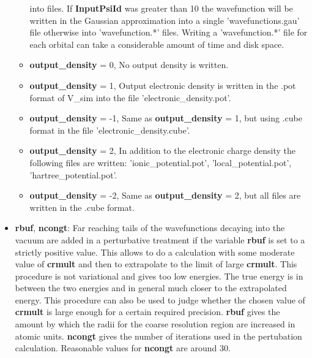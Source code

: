 \documentclass[a4paper,11pt]{report}
\begin{document}
\begin{itemize}
\begin{itemize}
                               into files. If {\bf InputPsiId } was greater than 10 the wavefunction will be written 
                               in the Gaussian approximation into  a single 'wavefunctions.gau' file otherwise into 
                               'wavefunction.*' files. Writing a  'wavefunction.*' file for each orbital can take a considerable 
                               amount of time and disk space. 
       \item {\bf output\_density} = 0, No output density is written.
       \item {\bf output\_density} = 1, Output electronic density is written in the .pot format of V\_sim into the file 'electronic\_density.pot'.
       \item {\bf output\_density} = -1, Same as  {\bf output\_density} = 1, but using .cube format in the file 'electronic\_density.cube'.
       \item {\bf output\_density} = 2, In addition to the electronic charge density the following files are written:
                                  'ionic\_potential.pot', 'local\_potential.pot', 'hartree\_potential.pot'.
       \item {\bf output\_density} = -2, Same as {\bf output\_density} = 2, but all files are written in the .cube format.
      \end{itemize}
\item {\bf rbuf}, {\bf ncongt}:  Far reaching tails of the wavefunctions decaying into the vacuum are  
                                      added in a perturbative
treatment if the variable {\bf rbuf} is set to a strictly positive value. 
                                      This allows to do a calculation with some moderate 
                                      value of {\bf crmult} and then to extrapolate to the limit of large  {\bf crmult}. 
                                      This procedure is not variational and gives too low energies. The true energy is 
                                      in between the two energies and in general much closer to the extrapolated energy. 
                                      This procedure can also be used to judge whether the chosen value of  {\bf crmult} is 
                                      large enough for a certain required precision.
                                      {\bf rbuf} gives the amount by which the radii for the coarse resolution region 
                                      are increased in atomic units. {\bf ncongt} gives the number of iterations used 
                                      in the pertubation calculation. Reasonable values for {\bf ncongt} are around 30.  


\end{itemize}
\end{document}
